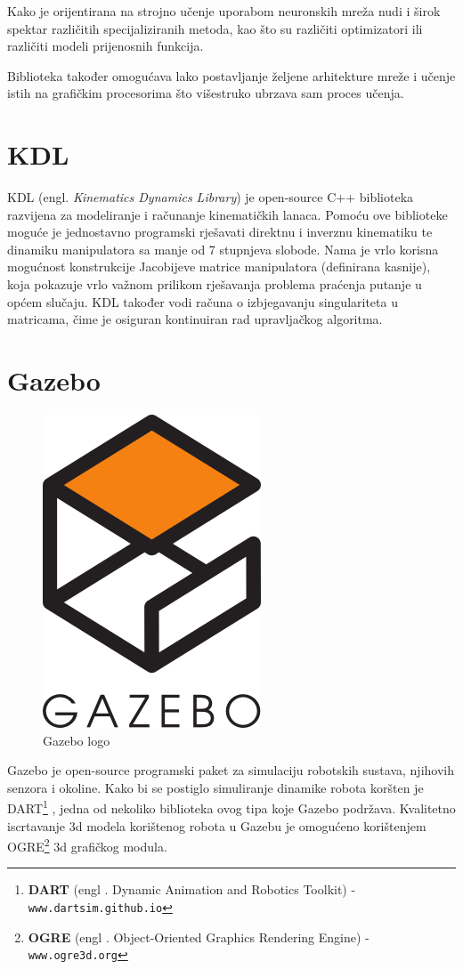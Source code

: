 \documentclass[times, utf8, diplomski, numeric]{fer}
\begin{document}
Kako je orijentirana na strojno učenje uporabom neuronskih mreža nudi i širok spektar različitih specijaliziranih metoda, kao što su različiti optimizatori ili različiti modeli prijenosnih funkcija.

Biblioteka također omogućava lako postavljanje željene arhitekture mreže i učenje istih na grafičkim procesorima što višestruko ubrzava sam proces učenja.

\section{KDL}
KDL (engl. \textit{Kinematics Dynamics Library}) je open-source C++ biblioteka razvijena za modeliranje i računanje kinematičkih lanaca.
Pomoću ove biblioteke moguće je jednostavno programski rješavati direktnu i inverznu kinematiku te dinamiku manipulatora sa manje od 7 stupnjeva slobode.
Nama je vrlo korisna mogućnost konstrukcije Jacobijeve matrice manipulatora (definirana kasnije), koja pokazuje vrlo važnom prilikom rješavanja problema praćenja putanje u općem slučaju.
KDL također vodi računa o izbjegavanju singulariteta u matricama, čime je osiguran kontinuiran rad upravljačkog algoritma.

\section{Gazebo}
\begin{figure}[H]
\centering
\includegraphics[scale=0.3]{gazebo_1}
\caption{Gazebo logo}
\end{figure}
Gazebo je open-source programski paket za simulaciju robotskih sustava, njihovih senzora i okoline.
Kako bi se postiglo simuliranje dinamike robota koršten je DART\footnote{\textbf{DART} (engl . Dynamic Animation and Robotics Toolkit) - \texttt{www.dartsim.github.io}} , jedna od nekoliko biblioteka ovog tipa koje Gazebo podržava.
Kvalitetno iscrtavanje 3d modela korištenog robota u Gazebu je omogućeno korištenjem OGRE\footnote{\textbf{OGRE} (engl . Object-Oriented Graphics Rendering Engine) - \texttt{www.ogre3d.org}} 3d grafičkog modula.
\end{document}
